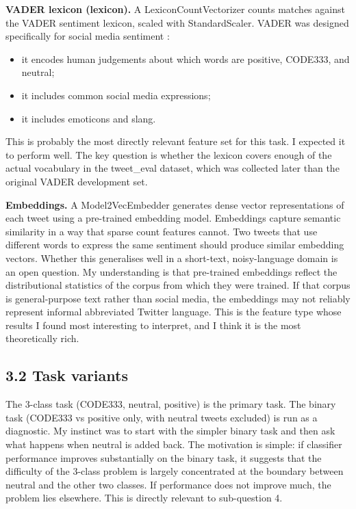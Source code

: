 \documentclass[12pt]{article}
\begin{document}
\textbf{VADER lexicon (lexicon).} A LexiconCountVectorizer counts matches against the VADER sentiment lexicon, scaled with StandardScaler. VADER was designed specifically for social media sentiment \citep{hutto2014vader}:

\begin{itemize}

  \item it encodes human judgements about which words are positive, CODE333, and neutral;

  \item it includes common social media expressions;

  \item it includes emoticons and slang.

\end{itemize} This is probably the most directly relevant feature set for this task. I expected it to perform well. The key question is whether the lexicon covers enough of the actual vocabulary in the tweet\_eval dataset, which was collected later than the original VADER development set.



\textbf{Embeddings.} A Model2VecEmbedder generates dense vector representations of each tweet using a pre-trained embedding model. Embeddings capture semantic similarity in a way that sparse count features cannot. Two tweets that use different words to express the same sentiment should produce similar embedding vectors. Whether this generalises well in a short-text, noisy-language domain is an open question. My understanding is that pre-trained embeddings reflect the distributional statistics of the corpus from which they were trained. If that corpus is general-purpose text rather than social media, the embeddings may not reliably represent informal abbreviated Twitter language. This is the feature type whose results I found most interesting to interpret, and I think it is the most theoretically rich.



\subsection*{3.2 Task variants}



The 3-class task (CODE333, neutral, positive) is the primary task. The binary task (CODE333 vs positive only, with neutral tweets excluded) is run as a diagnostic. My instinct was to start with the simpler binary task and then ask what happens when neutral is added back. The motivation is simple: if classifier performance improves substantially on the binary task, it suggests that the difficulty of the 3-class problem is largely concentrated at the boundary between neutral and the other two classes. If performance does not improve much, the problem lies elsewhere. This is directly relevant to sub-question 4.
\end{document}
